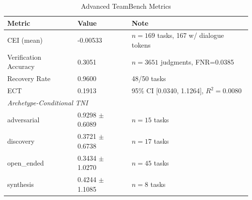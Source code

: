 \begin{table}[t]
\centering
\caption{Advanced TeamBench Metrics}
\label{tab:advanced_metrics}
\begin{tabular}{lll}
\toprule
\textbf{Metric} & \textbf{Value} & \textbf{Note} \\
\midrule
CEI (mean) & -0.00533 & $n=169$ tasks, 167 w/ dialogue tokens \\
Verification Accuracy & 0.3051 & $n=3651$ judgments, FNR=0.0385 \\
Recovery Rate & 0.9600 & 48/50 tasks \\
ECT & 0.1913 & 95\% CI [0.0340, 1.1264], $R^2=0.0080$ \\
\midrule
\multicolumn{3}{l}{\textit{Archetype-Conditional TNI}} \\
\quad adversarial & 0.9298 $\pm$ 0.6089 & $n=15$ tasks \\
\quad discovery & 0.3721 $\pm$ 0.6738 & $n=17$ tasks \\
\quad open\_ended & 0.3434 $\pm$ 1.0270 & $n=45$ tasks \\
\quad synthesis & 0.4244 $\pm$ 1.1085 & $n=8$ tasks \\
\bottomrule
\end{tabular}
\end{table}
